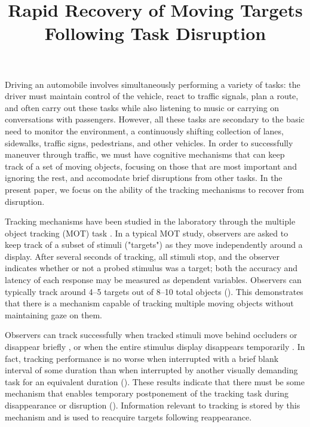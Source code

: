 \documentclass[jou,nobf]{apa}
\title{Rapid Recovery of Moving Targets Following Task Disruption}
\begin{document}
\maketitle

Driving an automobile involves simultaneously performing a variety of
tasks: the driver must maintain control of the vehicle, react to traffic
signals, plan a route, and often carry out these tasks while also listening
to music or carrying on conversations with passengers.  However, all these
tasks are secondary to the basic need to monitor the environment, a
continuously shifting collection of lanes, sidewalks, traffic signs,
pedestrians, and other vehicles.  In order to successfully maneuver through
traffic, we must have cognitive mechanisms that can keep track of a set of
moving objects, focusing on those that are most important and ignoring the
rest, and accomodate brief disruptions from other tasks.  In the present
paper, we focus on the ability of the tracking mechanisms to recover from
disruption.

Tracking mechanisms have been studied in the laboratory through the
multiple object tracking (MOT) task \cite{PylyshynStorm1988}.  In a typical
MOT study, observers are asked to keep track of a subset of stimuli
("targets") as they move independently around a display.  After several
seconds of tracking, all stimuli stop, and the observer indicates whether
or not a probed stimulus was a target; both the accuracy and latency of
each response may be measured as dependent variables.  Observers can
typically track around 4--5 targets out of 8--10 total objects
().  This demonstrates that there is a
mechanism capable of tracking multiple moving objects without maintaining
gaze on them.

Observers can track successfully when tracked stimuli move behind occluders
or disappear briefly \cite{FlombaumScholl2008,SchollPylyshyn1999}, or when
the entire stimulus display disappears temporarily
\cite{AlvarezHorowitz2005,FencsikKlieger2007,HorowitzBirnkrant2006,
  KeanePylyshyn2006}.  In fact, tracking performance is no worse when
interrupted with a brief blank interval of some duration than when
interrupted by another visually demanding task for an equivalent duration
().  These results indicate that there
must be some mechanism that enables temporary postponement of the tracking
task during disappearance or disruption
(\citeauthor{HorowitzBirnkrant2006}).  Information relevant to tracking is
stored by this mechanism and is used to reacquire targets following
reappearance.
\end{document}

